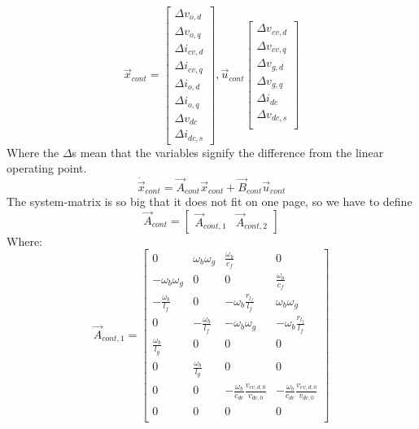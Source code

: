 \begin{equation}
\Vec{x}_{cont}=
\begin{bmatrix}
 \Delta v_{o,d}\\
 \Delta v_{o,q}\\
 \Delta i_{cv,d}\\
 \Delta i_{cv,q}\\
 \Delta i_{o,d}\\
 \Delta i_{o,q}\\
 \Delta v_{dc} \\
 \Delta i_{dc,s}
\end{bmatrix}{}
, \Vec{u}_{cont}
\begin{bmatrix}
 \Delta v_{cv,d}\\
 \Delta v_{cv,q}\\
 \Delta v_{g,d}\\
 \Delta v_{g,q}\\
 \Delta i_{dc}\\
 \Delta v_{dc,s}\\
\end{bmatrix}{}
\end{equation}{}
Where the $\Delta$s mean that the variables signify the difference from the linear operating point.
\begin{equation}
\Dot{\Vec{x}}_{cont}= 
\Vec{A}_{cont} \Vec{x}_{cont} + \Vec{B}_{cont}\Vec{u}_{cont}
\end{equation}{}
The system-matrix is so big that it does not fit on one page, so we have to define 
\begin{equation}
 \Vec{A}_{cont}= 
 \begin{bmatrix}
 \Vec{A}_{cont, 1} & \Vec{A}_{cont,2}
 \end{bmatrix}
\end{equation}
Where: 
\begin{equation}
 \Vec{A}_{cont,1}=
 \begin{bmatrix}
 0 & \omega_b\omega_g & \frac{\omega_b}{c_f} & 0 \\
 -\omega_b\omega_g & 0 & 0 & \frac{\omega_b}{c_f} \\
 -\frac{\omega_b}{l_f}&0 &- \omega_b\frac{r_{l_f}}{l_f} & \omega_b\omega_g \\
 0 &-\frac{\omega_b}{l_f} &-\omega_b\omega_g & -\omega_b\frac{r_{l_f}}{l_f} \\
 \frac{\omega_b}{l_g} & 0 & 0 & 0 \\
 0 & \frac{\omega_b}{l_g} & 0 & 0 \\
 0 &0 &-\frac{\omega_b}{c_{dc}}\frac{v_{cv,d,0}}{v_{dc,0}}&-\frac{\omega_b}{c_{dc}}\frac{v_{cv,d,0}}{v_{dc,0}}\\
 0 &0 &0 &0 \\
 
 \end{bmatrix}{}
\end{equation}{}

